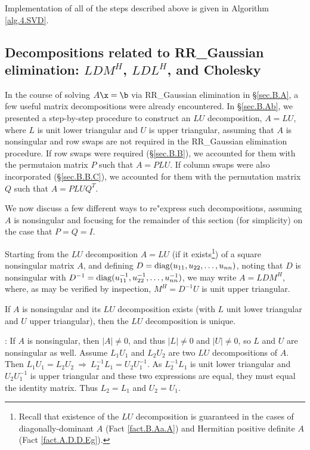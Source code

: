 Implementation of all of the steps described above is given in Algorithm \ref{alg.4.SVD}.

\clearpage
\subsection{Decompositions related to RR_Gaussian elimination: $LDM^{H}$, $LDL^{H}$, and Cholesky}\label{sec.A.D.I}

In the course of solving $A\x=\b$ via RR_Gaussian elimination
in \S \ref{sec.B.A}, a few useful matrix decompositions were already
encountered.  In \S \ref{sec.B.Ab}, we presented a step-by-step
procedure to construct an $LU$ decomposition, $A=LU$, where $L$ is
unit lower triangular and $U$ is upper triangular, assuming that $A$
is nonsingular and row swaps are not required in the RR_Gaussian
elimination procedure.  If row swaps were required (\S \ref{sec.B.B}),
we accounted for them with the permutaion matrix $P$ such that
$A=PLU$.  If column swaps were also incorporated (\S \ref{sec.B.B.C}),
we accounted for them with the permutation matrix $Q$ such that
$A=PLU\!Q^{T}$.

We now discuss a few different ways to re"express such
decompositions, assuming $A$ is nonsingular and focusing for the
remainder of this section (for simplicity) on the case that $P=Q=I$.

Starting from the $LU$ decomposition $A=LU$ (if it
exists\footnote{Recall that existence of the $LU$ decomposition is
guaranteed in the cases of diagonally-dominant $A$ (Fact \ref{fact.B.Aa.A})
and Hermitian positive definite $A$ (Fact \ref{fact.A.D.D.Eg}).}) of a square nonsingular matrix $A$, and
defining $D={\rm diag}(u_{11},u_{22},\ldots,u_{nn})$, noting that $D$
is nonsingular with $D^{-1}={\rm
diag}(u^{-1}_{11},u^{-1}_{22},\ldots,u^{-1}_{nn})$, we may write
$A=LDM^{H}$, where, as may be verified by inspection, $M^{H}=D^{-1}U$
is unit upper triangular.

\begin{fact} \label{fact.B.Aa.Az}
If $A$ is nonsingular and its $LU$ decomposition exists (with $L$ unit lower triangular
and $U$ upper triangular), then the $LU$ decomposition is unique.
\end{fact}

\/: If $A$ is nonsingular, then $|A|\ne 0$, and thus $|L|\ne 0$ and $|U|\ne 0$, so
$L$ and $U$ are nonsingular as well.  Assume $L_{1}U_{1}$ and $L_{2}U_{2}$ are two
$LU$ decompositions of $A$.  Then $L_{1}U_{1}=L_{2}U_{2}\ \Rightarrow\
L_{2}^{-1}L_{1}=U_{2}U_{1}^{-1}$.  As $L_{2}^{-1}L_{1}$ is unit lower
triangular and $U_{2}U_{1}^{-1}$ is upper triangular and these two
expressions are equal, they must equal the identity matrix.  Thus
$L_{2}=L_{1}$ and $U_{2}=U_{1}$.   \endproof \vskip0.1in

